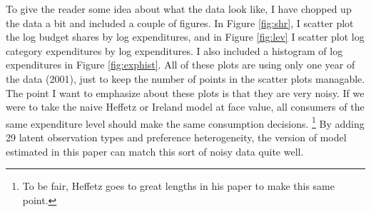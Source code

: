 \documentclass{article}
\begin{document}
To give the reader some idea about what the data look like, I have chopped up the data a bit and included a couple of figures.  
In Figure \ref{fig:shr}, I scatter plot the log budget shares by log expenditures, and in Figure \ref{fig:lev} I scatter plot log category expenditures by log expenditures.  
I also included a histogram of log expenditures in Figure \ref{fig:exphist}.  
All of these plots are using only one year of the data (2001), just to keep the number of points in the scatter plots managable. 
The point I want to emphasize about these plots is that they are very noisy.
If we were to take the naive Heffetz or Ireland model at face value, all consumers of the same expenditure level should make the same consumption decisions.
\footnote{To be fair, Heffetz goes to great lengths in his paper to make this same point.}
By adding 29 latent observation types and preference heterogeneity, the version of model estimated in this paper can match this sort of noisy data quite well.
\end{document}
